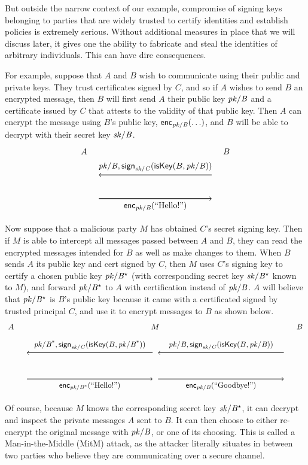\documentclass[11pt]{article}
\begin{document}
But outside the narrow context of our example, compromise of signing
keys belonging to parties that are widely trusted to certify
identities and establish policies is extremely serious. Without
additional measures in place that we will discuss later, it gives one
the ability to fabricate and steal the identities of arbitrary
individuals. This can have dire consequences.

For example, suppose that $A$ and $B$ wish to communicate using their
public and private keys. They trust certificates signed by $C$, and so
if $A$ wishes to send $B$ an encrypted message, then $B$ will first
send $A$ their public key $\mathit{pk/B}$ and a certificate issued by $C$
that attests to the validity of that public key. Then $A$ can
encrypt the message using $B$'s public key, $\mathsf{enc}_{{\mathit{pk/B}}}(\ldots)$,
and $B$ will be able to decrypt with their secret key $\mathit{sk/B}$.
\[
  \begin{tikzpicture}
    \node at (-0.5,3) {$A$};
    \node at (5.5,3) {$B$};
    \node (a1) at (0,2) {};
    \node (b1) at (5,2) {};
    \draw[thick,->] (b1) -- (a1) node[above,midway]{${\mi{pk/B}, \sign{\mi{sk/C}}(\ms{isKey}(B, \mi{pk/B}))}$};
    \node (a2) at (0,1) {};
    \node (b2) at (5,1) {};
    \draw[thick,->] (a2) -- (b2) node[below,midway]{${\enc{\mi{pk/B}}(\mbox{``Hello!''})}$};
  \end{tikzpicture}
\]
Now suppose that a malicious party $M$ has obtained $C$'s secret
signing key. Then if $M$ is able to intercept all messages passed
between $A$ and $B$, they can read the encrypted messages intended for
$B$ as well as make changes to them. When $B$ sends $A$ its public key
and cert signed by $C$, then $M$ uses $C$'s signing key to certify a
chosen public key $\mathit{pk/B^\star}$ (with corresponding secret key
$\mathit{sk/B^\star}$ known to $M$), and forward $\mathit{pk/B^\star}$ to $A$ with
certification instead of $\mathit{pk/B}$. $A$ will believe that
$\mathit{pk/B^\star}$ is $B$'s public key because it came with a certificated
signed by trusted principal $C$, and use it to encrypt messages to $B$
as shown below.
\[
  \begin{tikzpicture}[scale=1.2]
    \node at (-0.5,3) {$A$};
    \node at (5,3) {$M$};
    \node at (10.5,3) {$B$};
    \node (a1) at (0,2) {};
    \node (m1) at (5,2) {};
    \node (b1) at (10,2) {};
    \draw[thick,->] (b1) -- (m1) node[above,midway]{${\mi{pk/B}, \sign{\mi{sk/C}}(\ms{isKey}(B, \mi{pk/B}))}$};
    \draw[thick,->] (m1) -- (a1) node[above,midway]{${\mi{pk/B}^*, \sign{\mi{sk/C}}(\ms{isKey}(B, \mi{pk/B}^*))}$};
    \node (a2) at (0,1) {};
    \node (m2) at (5,1) {};
    \node (b2) at (10,1) {};
    \draw[thick,->] (a2) -- (m2) node[below,midway]{${\enc{\mi{pk/B}^*}(\mbox{``Hello!''})}$};
    \draw[thick,->] (m2) -- (b2) node[below,midway]{${\enc{\mi{pk/B}}(\mbox{``Goodbye!''})}$};
  \end{tikzpicture}
\]
Of course, because $M$ knows the corresponding secret key $\mathit{sk/B^\star}$, it can
decrypt and inspect the private messages $A$ sent to $B$. It can then choose to
either re-encrypt the original message with $\mathit{pk/B}$, or one of its
choosing. This is called a Man-in-the-Middle (MitM) attack, as the
attacker literally situates in between two parties who believe they are
communicating over a secure channel.
\end{document}
